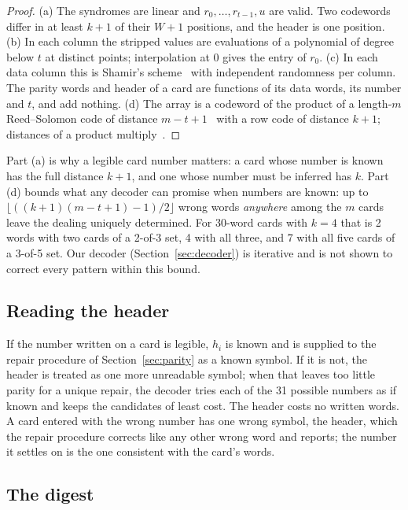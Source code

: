 \documentclass[numeric]{anvil-paper}
\begin{document}
\begin{proof}
(a) The syndromes are linear and $r_0,\dots,r_{t-1},u$ are valid. Two codewords
differ in at least $k+1$ of their $W+1$ positions, and the header is one
position.
(b) In each column the stripped values are evaluations of a polynomial of
degree below $t$ at distinct points; interpolation at $0$ gives the entry of
$r_0$.
(c) In each data column this is Shamir's scheme~\citep{shamir1979how} with
independent randomness per column. The parity words and header of a card are
functions of its data words, its number and $t$, and add nothing.
(d) The array is a codeword of the product of a length-$m$ Reed--Solomon code
of distance $m-t+1$~\citep{mceliece1981sharing} with a row code of distance
$k+1$; distances of a product multiply~\citep{elias1954error}.
\end{proof}

Part (a) is why a legible card number matters: a card whose number is known has
the full distance $k+1$, and one whose number must be inferred has $k$. Part
(d) bounds what any decoder can promise when numbers are known: up to
$\lfloor((k+1)(m-t+1)-1)/2\rfloor$ wrong words \emph{anywhere} among the $m$
cards leave the dealing uniquely determined. For 30-word cards with $k=4$ that
is 2 words with two cards of a 2-of-3 set, 4 with all three, and 7 with all
five cards of a 3-of-5 set. Our decoder (Section~\ref{sec:decoder}) is
iterative and is not shown to correct every pattern within this bound.

\subsection{Reading the header}

If the number written on a card is legible, $h_i$ is known and is supplied to
the repair procedure of Section~\ref{sec:parity} as a known symbol. If it is not, the header is treated as one
more unreadable symbol; when that leaves too little parity for a unique
repair, the decoder tries each of the 31 possible numbers as if known and keeps
the candidates of least cost. The header costs no written words. A card entered with the wrong number has
one wrong symbol, the header, which the repair procedure corrects like any
other wrong word and reports; the number it settles on is the one consistent
with the card's words.

\subsection{The digest}
\label{sec:digest}
\end{document}
